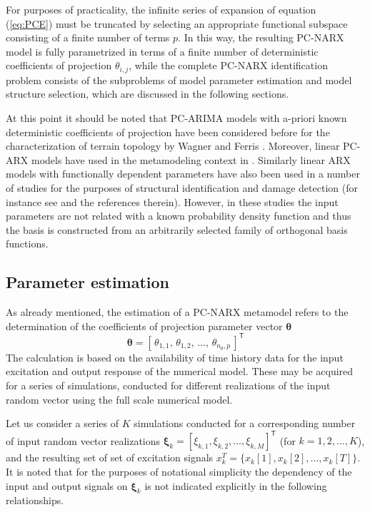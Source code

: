 \documentclass[12pt,a4paper,twocolumn,fleqn]{narms}
\newcommand{\bld}[1]{\boldsymbol{#1}}
\newcommand{\bth}{\bld{\theta}}
\newcommand{\bxi}{\bld{\xi}}
\newcommand{\beq}{\begin{equation}}
\newcommand{\eeq}{\end{equation}}
\begin{document}
For purposes of practicality, the infinite series of expansion of equation (\ref{eq:PCE}) must be truncated by selecting an appropriate functional subspace consisting of a finite number of terms $p$. In this way, the resulting PC-NARX model is fully parametrized in terms of a finite number of deterministic coefficients of projection $\theta_{i,j}$, while the complete PC-NARX identification problem consists of the subproblems of model parameter estimation and model structure selection, which are discussed in the following sections.

At this point it should be noted that PC-ARIMA models with a-priori known deterministic coefficients of projection have been considered before for the characterization of terrain topology by Wagner and Ferris \cite{Wagner-Ferris2007}. Moreover, linear PC-ARX models have used in the metamodeling context in \cite{Spiridonakos-Chatzi2012}. Similarly linear ARX models with functionally dependent parameters have also been used in a number of studies for the purposes of structural identification and damage detection (for instance see  and the references therein). However, in these studies the input parameters are not related with a known probability density function and thus the basis is constructed from an arbitrarily selected family of orthogonal basis functions.


\subsection{Parameter estimation}\label{sec:MPE}

As already mentioned, the estimation of a PC-NARX metamodel refers to the determination of the coefficients of projection parameter vector $\bth$ 
\beq \bth = [\, \theta_{1,1} , \, \theta_{1,2}, \, \ldots ,\, \theta_{n_\theta,p} \, ]^{\mathsf T} \eeq 
The calculation is based on the availability of time history data for the input excitation and output response of the numerical model. These may be acquired for a series of simulations, conducted for different realizations of the input random vector using the full scale numerical model.


Let us consider a series of $K$ simulations conducted for a corresponding number of input random vector realizations $\bxi_k = [\xi_{k,1}, \xi_{k,2}, \ldots ,\xi_{k,M}]^{\mathsf T}$ (for $k=1,2,\ldots,K$), and the resulting set of set of excitation signals $x_k^T = \{ x_k[1], x_k[2], \ldots, x_k[T] \}$. It is noted that for the purposes of notational simplicity the dependency of the input and output signals on $\bxi_k$ is not indicated explicitly in the following relationships.
\end{document}
